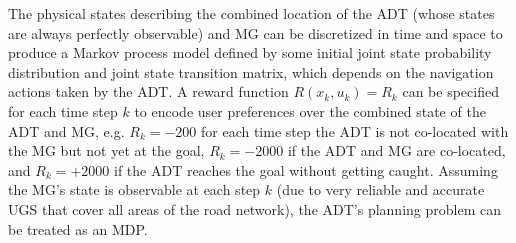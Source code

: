 The physical states describing the combined location of the ADT (whose states are always perfectly observable) and MG can be discretized in time and space to produce a Markov process model defined by some initial joint state probability distribution and joint state transition matrix, which depends on the navigation actions taken by the ADT.  
A reward function $R(x_k,u_k) = R_k$ can be specified for each time step $k$ to encode user preferences over the combined state of the ADT and MG, e.g. $R_k = -200$ for each time step the ADT is not co-located with the MG but not yet at the goal, $R_k= -2000$ if the ADT and MG are co-located, and $R_k=+2000$ if the ADT reaches the goal without getting caught. 
Assuming the MG's state is observable at each step $k$ (due to very reliable and accurate UGS that cover all areas of the road network), the ADT's planning problem can be treated as an MDP. 